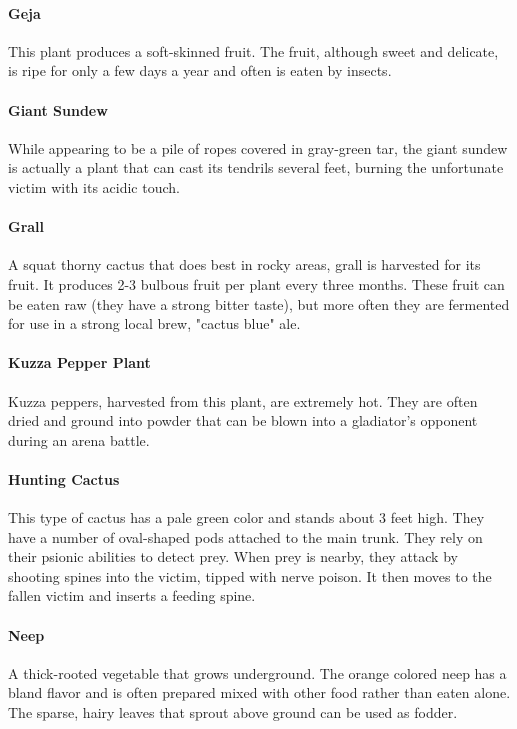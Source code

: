 \begin{multicols}{2}
\paragraph{Geja}
This plant produces a soft-skinned fruit. The fruit, although sweet and
delicate, is ripe for only a few days a year and often is eaten by insects.

\paragraph{Giant Sundew}
While appearing to be a pile of ropes covered in gray-green tar, the giant
sundew is actually a plant that can cast its tendrils several feet, burning
the unfortunate victim with its acidic touch.

\paragraph{Grall}
A squat thorny cactus that does best in rocky areas, grall is harvested for
its fruit. It produces 2-3 bulbous fruit per plant every three months. These
fruit can be eaten raw (they have a strong bitter taste), but more often
they are fermented for use in a strong local brew, "cactus blue" ale.

\paragraph{Kuzza Pepper Plant}
Kuzza peppers, harvested from this plant, are extremely hot. They are often
dried and ground into powder that can be blown into a gladiator's opponent
during an arena battle.

\paragraph{Hunting Cactus}
This type of cactus has a pale green color and stands about 3 feet high.
They have a number of oval-shaped pods attached to the main trunk. They
rely on their psionic abilities to detect prey. When prey is nearby, they
attack by shooting spines into the victim, tipped with nerve poison. It
then moves to the fallen victim and inserts a feeding spine.

\paragraph{Neep}
A thick-rooted vegetable that grows underground. The orange colored neep
has a bland flavor and is often prepared mixed with other food rather
than eaten alone. The sparse, hairy leaves that sprout above ground can
be used as fodder.


\end{multicols}

